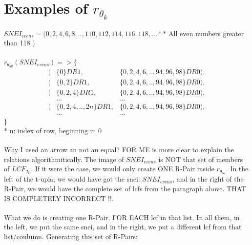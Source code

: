 	
	\newpage
	
	\section{Examples of $r_{\theta_{k}}$}
	
	\noindent
	$SNEI_{evens}= ( 0, 2, 4, 6, 8,..,110, 112, 114, 116, 118, ...**$ All even numbers greater than 118 $)$\\\\
	
	\noindent
	$r_{\theta_{50}} ( SNEI_{evens} )  => \{$
	\begin{align*}
		(&\{0\}DR1,	                 &\{0, 2, 4, 6, .. , 94, 96, 98\}DR0), \\
		(&\{0,2\}DR1,	             &\{0, 2, 4, 6, .. , 94, 96, 98\}DR0), \\
		(&\{0,2,4\}DR1,	             &\{0, 2, 4, 6, .. , 94, 96, 98\}DR0), \\
		 &...                        &...                                  \\
		(&\{0,2,4,.., 2n\}DR1,	     &\{0, 2, 4, 6, .. , 94, 96, 98\}DR0), \\	 
		 &...                        &...                                  		  
	\end{align*}
	$\}$\\
	* n: index of row, beginning in 0\\\\
	
	\noindent
	Why I used an arrow an not an equal? FOR ME is more clear to explain the relations algorithmitically. The image of $SNEI_{evens}$ is NOT that set of members of $LCF_{2p}$. If it were the case, we would only create ONE R-Pair inside $r_{\theta_{50}}$. In the left of the t-upla, we would have got the snei: $SNEI_{evens}$, and in the right of the R-Pair, we would have the complete set of lcfs from the paragraph above. THAT IS COMPLETELY INCORRECT !!.
	\\\\
	
	\noindent
	What we do is creating one R-Pair, FOR EACH lcf in that list. In all them, in the left, we put the same snei, and in the right, we put a different lcf from that list/coulumn. Generating this set of R-Pairs:
	\\\\
	
